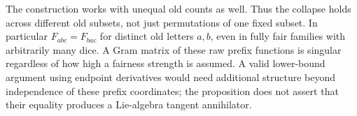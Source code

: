 \documentclass[11pt]{article}
\begin{document}
The construction works with unequal old counts as well. Thus the
collapse holds across different old subsets, not just permutations of
one fixed subset. In particular $F_{abc}=F_{bac}$ for distinct old
letters $a,b$, even in fully fair families with arbitrarily many dice.
A Gram matrix of these raw prefix functions is singular regardless of
how high a fairness strength is assumed. A valid lower-bound argument
using endpoint derivatives would need additional structure beyond
independence of these prefix coordinates; the proposition does not
assert that their equality produces a Lie-algebra tangent annihilator.
\end{document}

